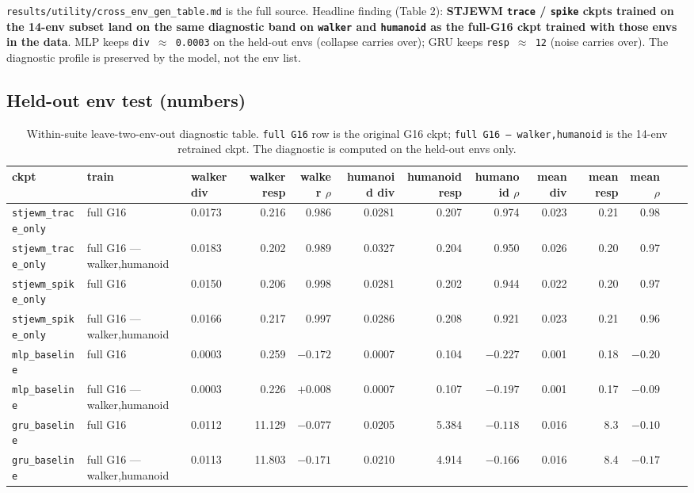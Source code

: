 \documentclass{article}
\begin{document}
\texttt{results/utility/cross\_env\_gen\_table.md} is the full source. Headline
finding (Table 2): \textbf{STJEWM \texttt{trace} / \texttt{spike} ckpts trained on the 14-env subset
land on the same diagnostic band on \texttt{walker} and \texttt{humanoid} as the full-G16
ckpt trained with those envs in the data}. MLP keeps \texttt{div $\approx$ 0.0003} on the
held-out envs (collapse carries over); GRU keeps \texttt{resp $\approx$ 12} (noise carries
over). The diagnostic profile is preserved by the model, not the env list.

\subsection{Held-out env test (numbers)}

\begin{table}[ht]
\centering
\small
\begin{tabular}{lllrrrrrrrrrr}
\toprule
ckpt & train & walker div & walker resp & walker $\rho$ & humanoid div & humanoid resp & humanoid $\rho$ & mean div & mean resp & mean $\rho$ \\
\midrule
\texttt{stjewm\_trace\_only} & full G16 & 0.0173 & 0.216 & 0.986 & 0.0281 & 0.207 & 0.974 & 0.023 & 0.21 & 0.98 \\
\texttt{stjewm\_trace\_only} & full G16 --- walker,humanoid & 0.0183 & 0.202 & 0.989 & 0.0327 & 0.204 & 0.950 & 0.026 & 0.20 & 0.97 \\
\texttt{stjewm\_spike\_only} & full G16 & 0.0150 & 0.206 & 0.998 & 0.0281 & 0.202 & 0.944 & 0.022 & 0.20 & 0.97 \\
\texttt{stjewm\_spike\_only} & full G16 --- walker,humanoid & 0.0166 & 0.217 & 0.997 & 0.0286 & 0.208 & 0.921 & 0.023 & 0.21 & 0.96 \\
\texttt{mlp\_baseline} & full G16 & 0.0003 & 0.259 & $-0.172$ & 0.0007 & 0.104 & $-0.227$ & 0.001 & 0.18 & $-0.20$ \\
\texttt{mlp\_baseline} & full G16 --- walker,humanoid & 0.0003 & 0.226 & $+0.008$ & 0.0007 & 0.107 & $-0.197$ & 0.001 & 0.17 & $-0.09$ \\
\texttt{gru\_baseline} & full G16 & 0.0112 & 11.129 & $-0.077$ & 0.0205 & 5.384 & $-0.118$ & 0.016 & 8.3 & $-0.10$ \\
\texttt{gru\_baseline} & full G16 --- walker,humanoid & 0.0113 & 11.803 & $-0.171$ & 0.0210 & 4.914 & $-0.166$ & 0.016 & 8.4 & $-0.17$ \\
\bottomrule
\end{tabular}
\caption{Within-suite leave-two-env-out diagnostic table. \texttt{full G16} row is the original G16 ckpt; \texttt{full G16 --- walker,humanoid} is the 14-env retrained ckpt. The diagnostic is computed on the held-out envs only.}
\label{tab:cross-env}
\end{table}
\end{document}
